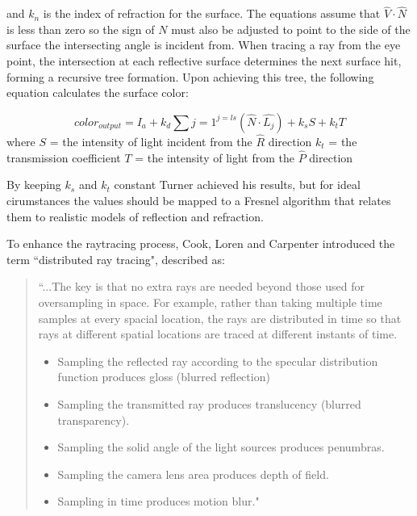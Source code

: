 and $k_{n}$ is the index of refraction for the surface.  The equations assume that ${\hat{V} \cdot \hat{N}}$ is less than zero so the sign of ${N}$ must also be adjusted to point to the side of the surface the intersecting angle is incident from. When tracing a ray from the eye point, the intersection at each reflective surface determines the next surface hit, forming a recursive tree formation.  Upon achieving this tree, the following equation calculates the surface color:

\begin{equation}
\label{eq:raytracing5}
color_{output} = I_{a} + k_{d} \sum{j=1}^{j=ls}(\hat{N} \cdot \hat{L_{j}}) + k_{s}S + k_{t}T
\end{equation}
where \newline
\noindent
$S$ = the intensity of light incident from the $\hat{R}$ direction\newline
$k_{t}$ = the transmission coefficient\newline
$T$ = the intensity of light from the $\hat{P}$ direction\newline

By keeping $k_{s}$ and $k_{t}$ constant Turner achieved his results, but for ideal cirumstances the values should be mapped to a Fresnel algorithm that relates them to realistic models of reflection and refraction.

To enhance the raytracing process, Cook, Loren and Carpenter introduced the term ``distributed ray tracing", described as:

\begin{quote}
``...The key is that no extra rays are needed beyond those used for oversampling in space.  For example, rather than taking multiple time samples at every spacial location, the rays are distributed in time so that rays at different spatial locations are traced at different instants of time.
\begin{itemize}
\item Sampling the reflected ray according to the specular distribution function produces gloss (blurred reflection)
\item Sampling the transmitted ray produces translucency (blurred transparency).
\item Sampling the solid angle of the light sources produces penumbras.
\item Sampling the camera lens area produces depth of field.
\item Sampling in time produces motion blur."
\end{itemize}
\end{quote}

